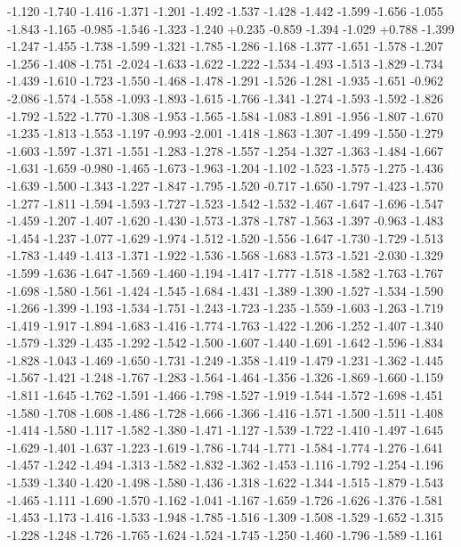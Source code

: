 \documentclass[9pt]{article}
\theoremstyle{plain}
\theoremstyle{definition}
\theoremstyle{remark}
\numberwithin{equation}{section}
\begin{document}
-1.120
-1.740
-1.416
-1.371
-1.201
-1.492
-1.537
-1.428
-1.442
-1.599
-1.656
-1.055
-1.843
-1.165
-0.985
-1.546
-1.323
-1.240
+0.235
-0.859
-1.394
-1.029
+0.788
-1.399
-1.247
-1.455
-1.738
-1.599
-1.321
-1.785
-1.286
-1.168
-1.377
-1.651
-1.578
-1.207
-1.256
-1.408
-1.751
-2.024
-1.633
-1.622
-1.222
-1.534
-1.493
-1.513
-1.829
-1.734
-1.439
-1.610
-1.723
-1.550
-1.468
-1.478
-1.291
-1.526
-1.281
-1.935
-1.651
-0.962
-2.086
-1.574
-1.558
-1.093
-1.893
-1.615
-1.766
-1.341
-1.274
-1.593
-1.592
-1.826
-1.792
-1.522
-1.770
-1.308
-1.953
-1.565
-1.584
-1.083
-1.891
-1.956
-1.807
-1.670
-1.235
-1.813
-1.553
-1.197
-0.993
-2.001
-1.418
-1.863
-1.307
-1.499
-1.550
-1.279
-1.603
-1.597
-1.371
-1.551
-1.283
-1.278
-1.557
-1.254
-1.327
-1.363
-1.484
-1.667
-1.631
-1.659
-0.980
-1.465
-1.673
-1.963
-1.204
-1.102
-1.523
-1.575
-1.275
-1.436
-1.639
-1.500
-1.343
-1.227
-1.847
-1.795
-1.520
-0.717
-1.650
-1.797
-1.423
-1.570
-1.277
-1.811
-1.594
-1.593
-1.727
-1.523
-1.542
-1.532
-1.467
-1.647
-1.696
-1.547
-1.459
-1.207
-1.407
-1.620
-1.430
-1.573
-1.378
-1.787
-1.563
-1.397
-0.963
-1.483
-1.454
-1.237
-1.077
-1.629
-1.974
-1.512
-1.520
-1.556
-1.647
-1.730
-1.729
-1.513
-1.783
-1.449
-1.413
-1.371
-1.922
-1.536
-1.568
-1.683
-1.573
-1.521
-2.030
-1.329
-1.599
-1.636
-1.647
-1.569
-1.460
-1.194
-1.417
-1.777
-1.518
-1.582
-1.763
-1.767
-1.698
-1.580
-1.561
-1.424
-1.545
-1.684
-1.431
-1.389
-1.390
-1.527
-1.534
-1.590
-1.266
-1.399
-1.193
-1.534
-1.751
-1.243
-1.723
-1.235
-1.559
-1.603
-1.263
-1.719
-1.419
-1.917
-1.894
-1.683
-1.416
-1.774
-1.763
-1.422
-1.206
-1.252
-1.407
-1.340
-1.579
-1.329
-1.435
-1.292
-1.542
-1.500
-1.607
-1.440
-1.691
-1.642
-1.596
-1.834
-1.828
-1.043
-1.469
-1.650
-1.731
-1.249
-1.358
-1.419
-1.479
-1.231
-1.362
-1.445
-1.567
-1.421
-1.248
-1.767
-1.283
-1.564
-1.464
-1.356
-1.326
-1.869
-1.660
-1.159
-1.811
-1.645
-1.762
-1.591
-1.466
-1.798
-1.527
-1.919
-1.544
-1.572
-1.698
-1.451
-1.580
-1.708
-1.608
-1.486
-1.728
-1.666
-1.366
-1.416
-1.571
-1.500
-1.511
-1.408
-1.414
-1.580
-1.117
-1.582
-1.380
-1.471
-1.127
-1.539
-1.722
-1.410
-1.497
-1.645
-1.629
-1.401
-1.637
-1.223
-1.619
-1.786
-1.744
-1.771
-1.584
-1.774
-1.276
-1.641
-1.457
-1.242
-1.494
-1.313
-1.582
-1.832
-1.362
-1.453
-1.116
-1.792
-1.254
-1.196
-1.539
-1.340
-1.420
-1.498
-1.580
-1.436
-1.318
-1.622
-1.344
-1.515
-1.879
-1.543
-1.465
-1.111
-1.690
-1.570
-1.162
-1.041
-1.167
-1.659
-1.726
-1.626
-1.376
-1.581
-1.453
-1.173
-1.416
-1.533
-1.948
-1.785
-1.516
-1.309
-1.508
-1.529
-1.652
-1.315
-1.228
-1.248
-1.726
-1.765
-1.624
-1.524
-1.745
-1.250
-1.460
-1.796
-1.589
-1.161
\end{document}
